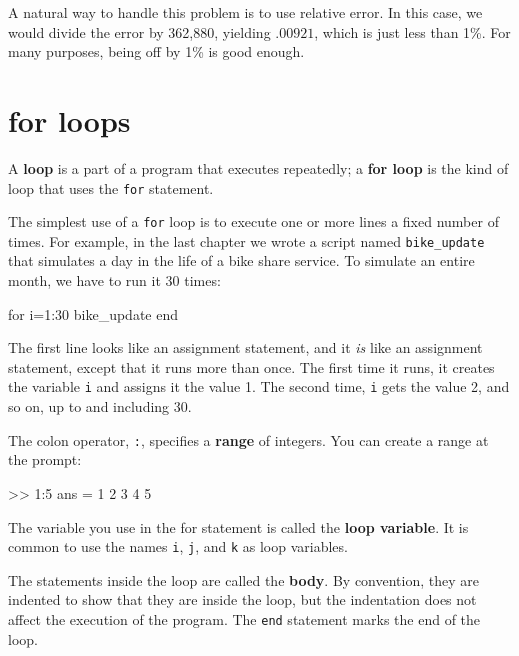 A natural way to handle this problem is to use relative
error.
In this case, we would divide the error
by 362,880, yielding $.00921$, which is just less than 1\%.
For many purposes, being off by 1\% is good enough.


\section{for loops}


A {\bf loop} is a part of a program that executes repeatedly;
a {\bf for loop} is the kind of loop that uses the {\tt for}
statement.

The simplest use of a {\tt for} loop is to execute one or more
lines a fixed number of times.
For example, in the last chapter
we wrote a script named \verb"bike_update" that simulates a
day in the life of a bike share service.  To simulate an entire
month, we have to run it 30 times:

\begin{code}
for i=1:30
    bike_update
end
\end{code}

The first line looks like an assignment statement, and it {\em is}
like an assignment statement, except that it runs more than once.  The
first time it runs, it creates the variable {\tt i} and assigns it the
value 1.  The second time, {\tt i} gets the value 2, and so on, up to
and including 30.


The colon operator, {\tt :}, specifies a {\bf range} of integers.
You can create a range at the prompt:

\begin{code}
>> 1:5
ans =  1     2     3     4     5
\end{code}

The variable you use in the for statement is called the {\bf loop
variable}.  It is common to use the names {\tt i},
{\tt j}, and {\tt k} as loop variables.


The statements inside the loop are called the {\bf body}.  By convention,
they are indented to show that they are inside the loop, but the
indentation does not affect the execution of the program.
The {\tt end} statement marks the end of the loop.

